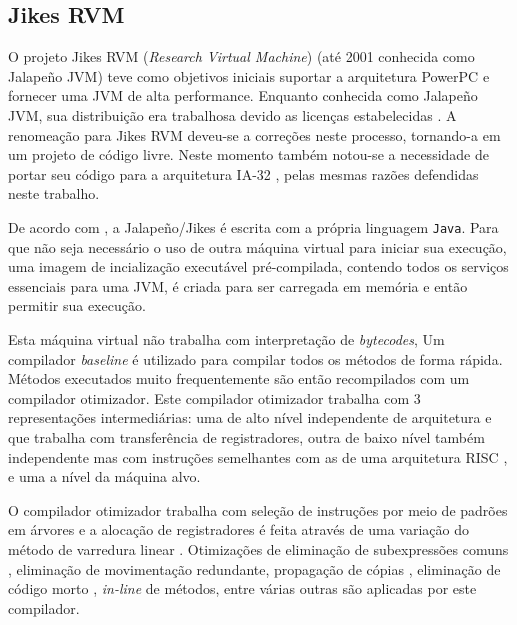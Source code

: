 \subsection{Jikes RVM}

O projeto Jikes RVM (\textit{Research Virtual Machine}) \cite{jikes}
(até 2001 conhecida como Jalapeño JVM) teve como objetivos iniciais
suportar a arquitetura PowerPC \cite{powerpc} e fornecer uma JVM de
alta performance. Enquanto conhecida como Jalapeño JVM, sua
distribuição era trabalhosa devido as licenças estabelecidas
\cite{jikesrvm2}. A renomeação para Jikes RVM deveu-se a correções
neste processo, tornando-a em um projeto de código livre. Neste momento
também notou-se a necessidade de portar seu código para a arquitetura
IA-32 \cite{jikesrvm2}, pelas mesmas razões defendidas neste trabalho.

De acordo com , a Jalapeño/Jikes é escrita com a
própria linguagem
\texttt{Java}. Para que não seja necessário o uso de outra máquina
virtual para iniciar sua execução, uma imagem de incialização
executável pré-compilada, contendo todos os serviços essenciais para
uma JVM, é criada para ser carregada em memória e então permitir sua
execução.

Esta máquina virtual não trabalha com interpretação de
\textit{bytecodes},
Um compilador \textit{baseline} é utilizado para
compilar todos os métodos de forma rápida. Métodos executados muito
frequentemente são então recompilados com um compilador otimizador.
Este compilador otimizador trabalha com 3 representações
intermediárias: uma de alto nível independente de arquitetura e que
trabalha com transferência de registradores, outra de
baixo nível também independente mas com instruções semelhantes com as
de uma arquitetura RISC \cite{risc}, e uma a nível da máquina alvo.

O compilador otimizador trabalha com seleção de instruções por meio de
padrões em árvores \cite{instrselect} e a
alocação de registradores é feita através de uma variação do método
de varredura linear \cite{linear_scan_regalloc}. Otimizações de
eliminação de subexpressões comuns \cite{muchnick}, eliminação de
movimentação redundante, propagação de cópias \cite{muchnick},
eliminação de código morto \cite{allen_kennedy}, \textit{in-line} de
métodos, entre várias outras são aplicadas por este compilador.

